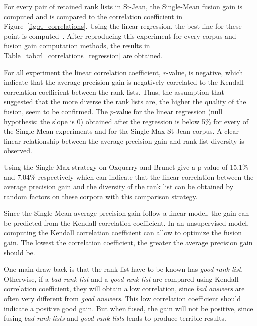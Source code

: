 For every pair of retained rank lists in St-Jean, the Single-Mean fusion gain is computed and is compared to the correlation coefficient in Figure~\ref{fig:rl_correlations}.
Using the linear regression, the best line for these point is computed~\cite{scipy}.
After reproducing this experiment for every corpus and fusion gain computation methods, the results in Table~\ref{tab:rl_correlations_regression} are obtained.

For all experiment the linear correlation coefficient, $r$-value, is negative, which indicate that the average precision gain is negatively correlated to the Kendall correlation coefficient between the rank lists.
Thus, the assumption that suggested that the more diverse the rank lists are, the higher the quality of the fusion, seem to be confirmed.
The $p$-value for the linear regression (null hypothesis: the slope is 0) obtained after the regression is below 5\% for every of the Single-Mean experiments and for the Single-Max St-Jean corpus.
A clear linear relationship between the average precision gain and rank list diversity is observed.

Using the Single-Max strategy on Oxquarry and Brunet give a p-value of 15.1\% and 7.04\% respectively which can indicate that the linear correlation between the average precision gain and the diversity of the rank list can be obtained by random factors on these corpora with this comparison strategy.

Since the Single-Mean average precision gain follow a linear model, the gain can be predicted from the Kendall correlation coefficient.
In an unsupervised model, computing the Kendall correlation coefficient can allow to optimize the fusion gain.
The lowest the correlation coefficient, the greater the average precision gain should be.

One main draw back is that the rank list have to be known has \textit{good rank list}.
Otherwise, if a \textit{bad rank list} and a \textit{good rank list} are compared using Kendall correlation coefficient, they will obtain a low correlation, since \textit{bad answers} are often very different from \textit{good answers}.
This low correlation coefficient should indicate a positive good gain.
But when fused, the gain will not be positive, since fusing \textit{bad rank lists} and \textit{good rank lists} tends to produce terrible results.

